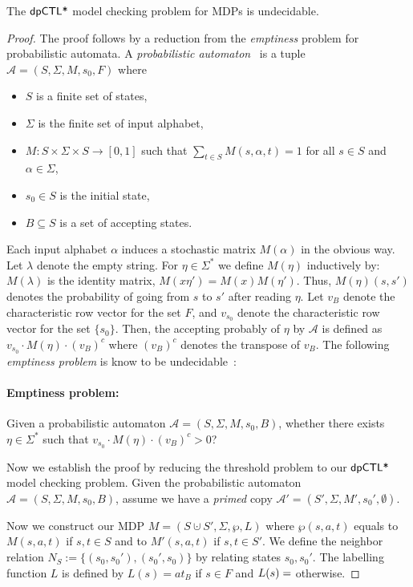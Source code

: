 \begin{theorem}
The $\textsf{dpCTL*}$ model checking problem for MDPs  is undecidable.
\end{theorem}
\begin{proof}
The proof follows by a reduction from the \emph{emptiness} problem for probabilistic automata.
A \emph{probabilistic automaton}~\cite{Rabin63} is a tuple $\mathcal{A}= (S,\Sigma,M,s_0,F)$ where
\begin{itemize}
  \item $S$ is a finite set of states,
  \item $\Sigma$ is the finite set of input alphabet,
  \item $M: S\times\Sigma\times S \to [0,1]$ such that $\sum_{t\in S} M(s,\alpha,t)=1$ for all $s\in S$ and $\alpha\in \Sigma$,
  \item $s_0\in S$ is the initial state,
  \item $B\subseteq S$ is a set of accepting states.
\end{itemize}

Each input alphabet $\alpha$ induces a stochastic matrix $M(\alpha)$ in the obvious way. Let $\lambda$ denote the empty string. For $\eta\in\Sigma^*$ we define $M(\eta)$ inductively by: $M(\lambda)$ is the identity matrix, $M(x\eta')=M(x)M(\eta')$. Thus, $M(\eta)(s,s')$ denotes the probability of going from $s$ to $s'$ after reading $\eta$. Let $v_B$ denote the characteristic row vector for the set $F$, and $v_{s_0}$ denote the characteristic row vector for the set $\{s_0\}$. Then, the accepting probably of $\eta$ by $\mathcal{A}$ is defined as $v_{s_0}\cdot M(\eta)\cdot (v_B)^c$ where $(v_B)^c$ denotes the transpose of $v_B$. The following \emph{emptiness problem} is know to be undecidable~\cite{Paz71}:

\paragraph{Emptiness problem:} Given a probabilistic automaton $\mathcal{A}= (S,\Sigma,M,s_0,B)$, whether there exists $\eta\in\Sigma^*$ such that $v_{s_0}\cdot M(\eta)\cdot (v_B)^c > 0$?

Now we establish the proof by reducing the threshold problem to our $\textsf{dpCTL*}$ model checking problem. Given the probabilistic automaton  $\mathcal{A}= (S,\Sigma,M,s_0,B)$, assume we have a \emph{primed} copy $\mathcal{A}'= (S',\Sigma,M',s_0',\emptyset)$.

Now we construct our MDP  $M =
(S\cupdot S', \Sigma, \wp, L)$ where $\wp(s,a,t)$ equals to $M(s,a,t)$ if $s,t\in S$ and to $M'(s,a,t)$ if $s,t\in S'$. We define the neighbor relation $N_S:=\{(s_0,s_0'),(s_0',s_0)\}$ by relating states $s_0,s_0'$. The labelling function $L$ is defined by $L(s)=at_B$ if $s\in F$ and $L(s)=\empty$ otherwise.


\end{proof}
